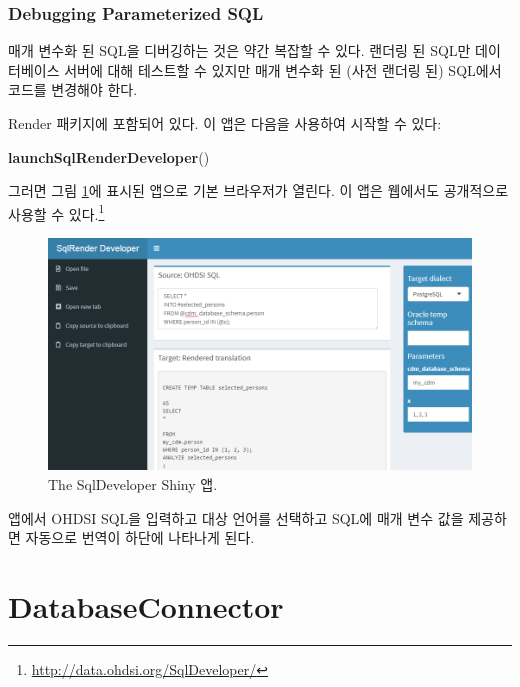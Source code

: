 \documentclass[11pt]{book}
\newenvironment{Shaded}{\begin{snugshade}}{\end{snugshade}}
\newcommand{\KeywordTok}[1]{\textcolor[rgb]{0.13,0.29,0.53}{\textbf{#1}}}
\newcommand{\NormalTok}[1]{#1}
\let\rmarkdownfootnote\footnote%
\def\footnote{\protect\rmarkdownfootnote}
\theoremstyle{definition}
\theoremstyle{definition}
\theoremstyle{definition}
\theoremstyle{remark}
\begin{document}
\subsubsection*{Debugging Parameterized
SQL}\label{debugging-parameterized-sql}

매개 변수화 된 SQL을 디버깅하는 것은 약간 복잡할 수 있다. 랜더링 된
SQL만 데이터베이스 서버에 대해 테스트할 수 있지만 매개 변수화 된 (사전
랜더링 된) SQL에서 코드를 변경해야 한다. 

Render 패키지에 포함되어 있다. 이 앱은 다음을 사용하여 시작할 수 있다:

\begin{Shaded}
\begin{Highlighting}[]
\KeywordTok{launchSqlRenderDeveloper}\NormalTok{()}
\end{Highlighting}
\end{Shaded}

그러면 그림 \ref{fig:sqlDeveloper}에 표시된 앱으로 기본 브라우저가
열린다. 이 앱은 웹에서도 공개적으로 사용할 수 있다.\footnote{\url{http://data.ohdsi.org/SqlDeveloper/}}

\begin{figure}

{\centering \includegraphics[width=1\linewidth]{images/SqlAndR/sqlDeveloper} 

}

\caption{The SqlDeveloper Shiny 앱.}\label{fig:sqlDeveloper}
\end{figure}

앱에서 OHDSI SQL을 입력하고 대상 언어를 선택하고 SQL에 매개 변수 값을
제공하면 자동으로 번역이 하단에 나타나게 된다.

\hypertarget{DatabaseConnector}{\section{DatabaseConnector}\label{DatabaseConnector}}
\end{document}
